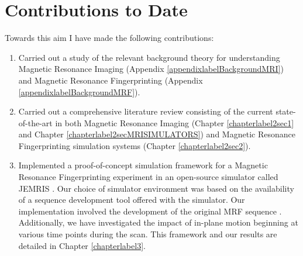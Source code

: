 \section{Contributions to Date}\label{chapterlabel4sec1}

Towards this aim I have made the following contributions:

\begin{enumerate}

	\item Carried out a study of the relevant background theory for understanding Magnetic Resonance Imaging (Appendix \ref{appendixlabelBackgroundMRI}) and Magnetic Resonance Fingerprinting (Appendix \ref{appendixlabelBackgroundMRF}).
	
	\item Carried out a comprehensive literature review consisting of the current state-of-the-art in both Magnetic Resonance Imaging (Chapter \ref{chapterlabel2sec1} and Chapter \ref{chapterlabel2secMRISIMULATORS}) and Magnetic Resonance Fingerprinting simulation systems (Chapter \ref{chapterlabel2sec2}).
	
	\item Implemented a proof-of-concept simulation framework for a Magnetic Resonance Fingerprinting experiment in an open-source simulator called JEMRIS \cite{Stocker2010}.
	Our choice of simulator environment was based on the availability of a sequence development tool offered with the simulator.
	Our implementation involved the development of the original MRF sequence \cite{Ma2013}.
	Additionally, we have investigated the impact of in-plane motion beginning at various time points during the scan.
	This framework and our results are detailed in Chapter \ref{chapterlabel3}.
	
\end{enumerate}